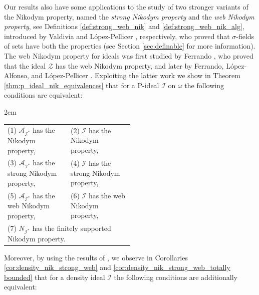 \documentclass[a4paper,11pt,fleqn]{amsart}
\theoremstyle{definition}
\theoremstyle{remark}
\numberwithin{equation}{section}
\newcommand{\aA}{\mathcal{A}}
\newcommand{\iI}{\mathcal{I}}
\newcommand{\zZ}{\mathcal{Z}}
\begin{document}
Our results also have some applications to the study of two stronger variants of the Nikodym property, named the \textit{strong Nikodym property} and the \textit{web Nikodym property}, see Definitions \ref{def:strong_web_nik} and \ref{def:strong_web_nik_alg}, introduced by Valdivia \cite{Val79} and L\'opez-Pellicer \cite{LP97}, respectively, who proved that $\sigma$-fields of sets have both the properties (see Section \ref{sec:definable} for more information). The web Nikodym property for ideals was first studied by Ferrando \cite{Fer02}, who proved that the ideal $\zZ$ has the web Nikodym property, and later by Ferrando, L\'opez-Alfonso, and L\'opez-Pellicer \cite{FLALP}. Exploiting the latter work we show in Theorem \ref{thm:p_ideal_nik_equivalences} that for a P-ideal $\iI$ on $\omega$ the following conditions are equivalent:
\vspace{1mm}
\begin{addmargin}[1em]{2em}%
\begin{tabular}{l p{0.5\linewidth}}
(1) $\aA_{\iI^*}$ has the Nikodym property, & (2) $\iI$ has the Nikodym property,\\
(3) $\aA_{\iI^*}$ has the strong Nikodym property, & (4) $\iI$ has the strong Nikodym property,\\
(5) $\aA_{\iI^*}$ has the web Nikodym property, & (6) $\iI$ has the web Nikodym property,\\
\multicolumn{2}{l}{(7) $N_{\iI^*}$ has the finitely supported Nikodym property.}\\
\end{tabular}
\end{addmargin}
\vspace{1mm}
Moreover, by using the results of \cite{Zuc25}, we observe in Corollaries \ref{cor:density_nik_strong_web} and \ref{cor:density_nik_strong_web_totally bounded} that for a density ideal $\iI$ the following conditions are additionally equivalent:
\end{document}
